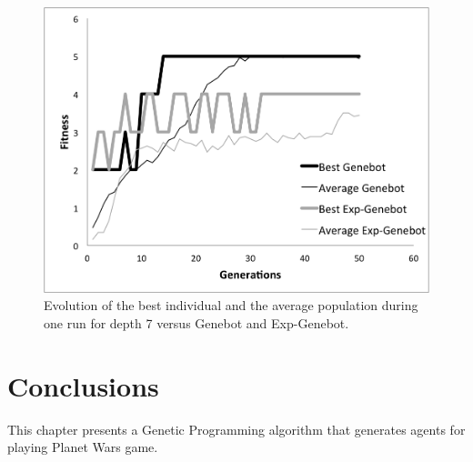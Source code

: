 \begin{figure}
\centering
\includegraphics[scale =0.60] {gfx/rts/generations.png}
\caption{Evolution of the best individual and the average population during one run for depth 7 versus Genebot and Exp-Genebot.}
\label{fig:gens}
\end{figure}
 
\section{Conclusions}
\label{sec:conclusion}

This chapter presents a Genetic Programming algorithm that generates
agents for playing Planet Wars game. 



